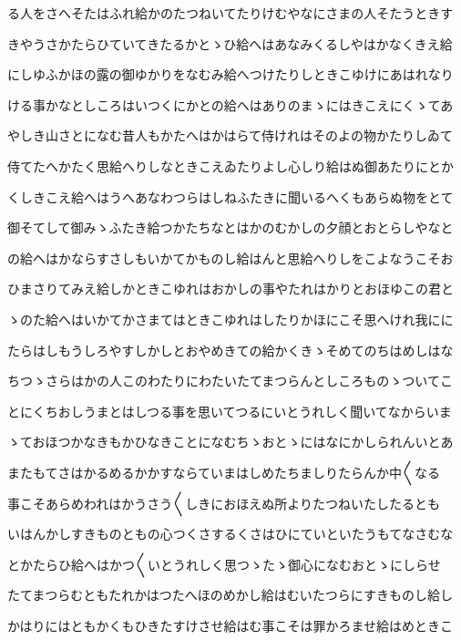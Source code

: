 \documentclass[a4paper,11pt,landscape]{ltjtarticle}
\begin{document}
\par\medskip
る人をさへそたはふれ給かのたつねいてたりけむやなにさまの人そたうときす
\par\medskip
きやうさかたらひていてきたるかとゝひ給へはあなみくるしやはかなくきえ給
\par\medskip
にしゆふかほの露の御ゆかりをなむみ給へつけたりしときこゆけにあはれなり
\par\medskip
ける事かなとしころはいつくにかとの給へはありのまゝにはきこえにくゝてあ
\par\medskip
やしき山さとになむ昔人もかたへはかはらて侍けれはそのよの物かたりしゐて
\par\medskip
侍てたへかたく思給へりしなときこえゐたりよし心しり給はぬ御あたりにとか
\par\medskip
くしきこえ給へはうへあなわつらはしねふたきに聞いるへくもあらぬ物をとて
\par\medskip
御そてして御みゝふたき給つかたちなとはかのむかしの夕顔とおとらしやなと
\par\medskip
の給へはかならすさしもいかてかものし給はんと思給へりしをこよなうこそお
\par\medskip
ひまさりてみえ給しかときこゆれはおかしの事やたれはかりとおほゆこの君と
\par\medskip
ゝのた給へはいかてかさまてはときこゆれはしたりかほにこそ思へけれ我にに
\par\medskip
たらはしもうしろやすしかしとおやめきての給かくきゝそめてのちはめしはな
\par\medskip
ちつゝさらはかの人このわたりにわたいたてまつらんとしころものゝついてこ
\par\medskip
とにくちおしうまとはしつる事を思いてつるにいとうれしく聞いてなからいま
\par\medskip
ゝておほつかなきもかひなきことになむちゝおとゝにはなにかしられんいとあ
\par\medskip
またもてさはかるめるかかすならていまはしめたちましりたらんか中〱なる
\par\medskip
事こそあらめわれはかうさう〱しきにおほえぬ所よりたつねいたしたるとも
\par\medskip
いはんかしすきものともの心つくさするくさはひにていといたうもてなさむな
\par\medskip
とかたらひ給へはかつ〱いとうれしく思つゝたゝ御心になむおとゝにしらせ
\par\medskip
たてまつらむともたれかはつたへほのめかし給はむいたつらにすきものし給し
\par\medskip
かはりにはともかくもひきたすけさせ給はむ事こそは罪かろませ給はめときこ
\par\medskip
\end{document}
